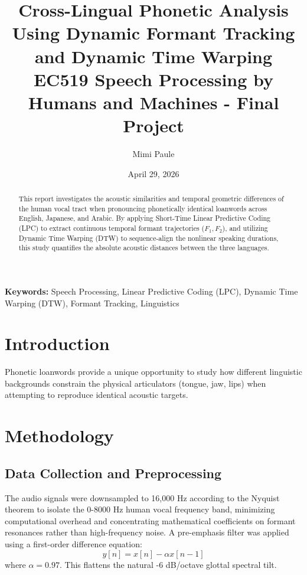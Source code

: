 \documentclass[11pt]{article}
\begin{document}
\title{Cross-Lingual Phonetic Analysis Using Dynamic Formant Tracking and Dynamic Time Warping\\
{\large EC519 Speech Processing by Humans and Machines - Final Project}
}

\author{Mimi Paule}
\date{April 29, 2026}
\maketitle
\vspace{-1cm}
\begin{abstract}
This report investigates the acoustic similarities and temporal geometric differences of the human vocal tract when pronouncing phonetically identical loanwords across English, Japanese, and Arabic. By applying Short-Time Linear Predictive Coding (LPC) to extract continuous temporal formant trajectories ($F_1, F_2$), and utilizing Dynamic Time Warping (DTW) to sequence-align the nonlinear speaking durations, this study quantifies the absolute acoustic distances between the three languages. %
\end{abstract}

\textbf{Keywords:} Speech Processing, Linear Predictive Coding (LPC), Dynamic Time Warping (DTW), Formant Tracking, Linguistics

\section{Introduction}
Phonetic loanwords provide a unique opportunity to study how different linguistic backgrounds constrain the physical articulators (tongue, jaw, lips) when attempting to reproduce identical acoustic targets. 

\section{Methodology}

\subsection{Data Collection and Preprocessing}
The audio signals were downsampled to 16,000 Hz according to the Nyquist theorem to isolate the 0-8000 Hz human vocal frequency band, minimizing computational overhead and concentrating mathematical coefficients on formant resonances rather than high-frequency noise. A pre-emphasis filter was applied using a first-order difference equation:
\begin{equation}
y[n] = x[n] - \alpha x[n-1]
\end{equation}
where $\alpha = 0.97$. This flattens the natural -6 dB/octave glottal spectral tilt.
\end{document}
